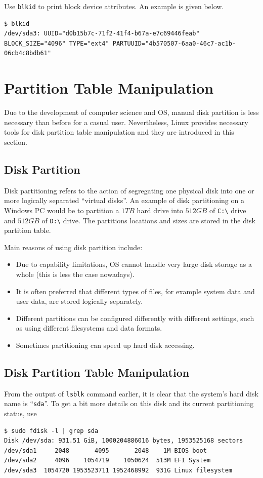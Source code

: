 Use \verb|blkid| to print block device attributes. An example is given below.
\begin{lstlisting}
$ blkid
/dev/sda3: UUID="d0b15b7c-71f2-41f4-b67a-e7c69446feab" BLOCK_SIZE="4096" TYPE="ext4" PARTUUID="4b570507-6aa0-46c7-ac1b-06cb4c8bdb61"
\end{lstlisting}

\section{Partition Table Manipulation}

Due to the development of computer science and OS, manual disk partition is less necessary than before for a casual user. Nevertheless, Linux provides necessary tools for disk partition table manipulation and they are introduced in this section.

\subsection{Disk Partition}

Disk partitioning refers to the action of segregating one physical disk into one or more logically separated ``virtual disks''. An example of disk partitioning on a Windows PC would be to partition a $1TB$ hard drive into $512GB$ of \verb|C:\| drive and $512GB$ of \verb|D:\| drive. The partitions locations and sizes are stored in the disk partition table.

Main reasons of using disk partition include:
\begin{itemize}
  \item Due to capability limitations, OS cannot handle very large disk storage as a whole (this is less the case nowadays).
  \item It is often preferred that different types of files, for example system data and user data, are stored logically separately.
  \item Different partitions can be configured differently with different settings, such as using different filesystems and data formats.
  \item Sometimes partitioning can speed up hard disk accessing.
\end{itemize}

\subsection{Disk Partition Table Manipulation}

From the output of \verb|lsblk| command earlier, it is clear that the system's hard disk name is ``\verb|sda|''. To get a bit more details on this disk and its current partitioning status, use
\begin{lstlisting}
$ sudo fdisk -l | grep sda
Disk /dev/sda: 931.51 GiB, 1000204886016 bytes, 1953525168 sectors
/dev/sda1     2048       4095       2048    1M BIOS boot
/dev/sda2     4096    1054719    1050624  513M EFI System
/dev/sda3  1054720 1953523711 1952468992  931G Linux filesystem
\end{lstlisting}

